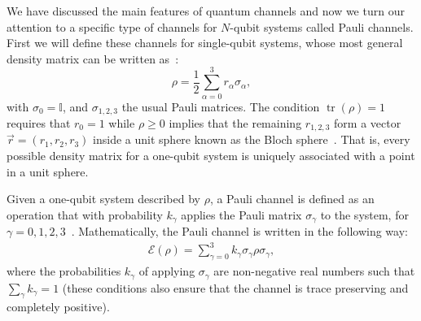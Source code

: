 \documentclass[10pt,letterpaper]{article} %
\DeclareMathOperator{\tr}{tr}
\begin{document}
We have discussed the main features of quantum channels and 
now we turn our attention to a specific 
type of channels for $N$-qubit systems called Pauli channels.
First we will define these channels for single-qubit systems,
whose most general density matrix can be written as~\cite{chuangbook}:
\begin{equation}
\label{eq: Density Matrix}
\rho = \dfrac{1}{2} \sum_{\alpha=0}^{3} r_{\alpha} \sigma_{\alpha},
\end{equation}
with $\sigma_0 = \mathbb{I}$, and $\sigma_{1,2,3}$ the usual Pauli matrices.
The condition $\tr(\rho) = 1$ requires that $r_0 = 1$ while $\rho \geq 0$ 
implies that the remaining $r_{1,2,3}$ form
a vector $\vec{r}= (r_1,r_2,r_3)$ inside a unit sphere known as the Bloch sphere~\cite{Marinescu}.
That is, every possible density matrix for a one-qubit
system is uniquely associated with a point in a unit sphere. 

Given a one-qubit system described by $\rho$, 
a Pauli channel is defined as an operation that with probability $k_{\gamma}$
applies the Pauli matrix $\sigma_{\gamma}$ to
the system, for $\gamma = 0,1,2,3$~\cite{geometry}.
Mathematically, the Pauli channel is written in the following way:
\begin{eqnarray}
\label{eq: Pauli channel 1 qbit}
\mathcal{E}(\rho) = \sum_{\gamma=0}^3 k_{\gamma} \sigma_{\gamma} \rho \sigma_{\gamma},
\end{eqnarray} 
where the probabilities $k_{\gamma}$ of applying $\sigma_{\gamma}$
are non-negative real numbers such that 
$\sum_{\gamma} k_{\gamma} = 1$ (these conditions also ensure that the channel is 
trace preserving and completely positive).
\end{document}
